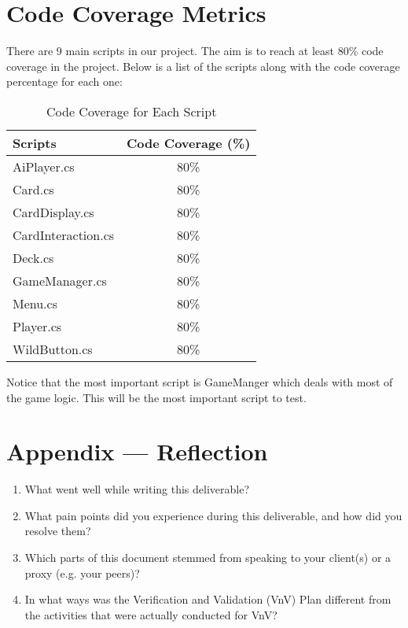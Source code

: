 \documentclass[12pt, titlepage]{article}
\begin{document}
\section{Code Coverage Metrics}
There are 9 main scripts in our project. The aim is to reach at least 80\% code coverage in the project. Below is a list of the scripts along with the code coverage percentage for each one:
\begin{table}[h]
    \centering
    \begin{tabular}{|l|c|}
        \hline
        \textbf{Scripts} & \textbf{Code Coverage (\%)} \\
        \hline
        AiPlayer.cs & 80\% \\ 
        Card.cs & 80\% \\ 
        CardDisplay.cs & 80\% \\ 
        CardInteraction.cs & 80\% \\ 
        Deck.cs & 80\% \\ 
        GameManager.cs & 80\% \\ 
        Menu.cs & 80\% \\ 
        Player.cs & 80\% \\ 
        WildButton.cs & 80\% \\ 
        \hline
    \end{tabular}
    \caption{Code Coverage for Each Script}
    \label{tab:code_coverage}
\end{table}
Notice that the most important script is GameManger which deals with most of the game logic. This will be the most important script to test.



\newpage{}
\section*{Appendix --- Reflection}

\begin{enumerate}
  \item What went well while writing this deliverable?
  \item What pain points did you experience during this deliverable, and how did you resolve them?
  \item Which parts of this document stemmed from speaking to your client(s) or a proxy (e.g. your peers)?
  \item In what ways was the Verification and Validation (VnV) Plan different from the activities that were actually conducted for VnV?
\end{enumerate}
\end{document}
